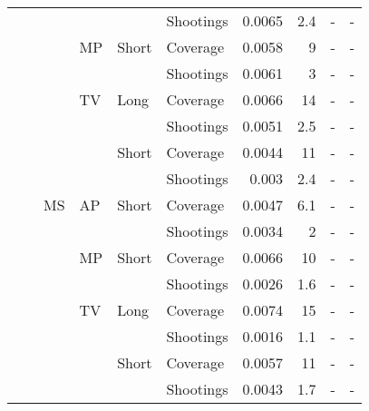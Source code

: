 \documentclass[article]{standalone}
\begin{document}
\begin{tabular}{llllllrrrr}
             &                   &    &    &       & Shootings &               0.0065 &       2.4 &                    - &                     - \\
             &                   &    & MP & Short & Coverage &               0.0058 &         9 &                    - &                     - \\
             &                   &    &    &       & Shootings &               0.0061 &         3 &                    - &                     - \\
             &                   &    & TV & Long & Coverage &               0.0066 &        14 &                    - &                     - \\
             &                   &    &    &       & Shootings &               0.0051 &       2.5 &                    - &                     - \\
             &                   &    &    & Short & Coverage &               0.0044 &        11 &                    - &                     - \\
             &                   &    &    &       & Shootings &                0.003 &       2.4 &                    - &                     - \\
             &                   & MS & AP & Short & Coverage &               0.0047 &       6.1 &                    - &                     - \\
             &                   &    &    &       & Shootings &               0.0034 &         2 &                    - &                     - \\
             &                   &    & MP & Short & Coverage &               0.0066 &        10 &                    - &                     - \\
             &                   &    &    &       & Shootings &               0.0026 &       1.6 &                    - &                     - \\
             &                   &    & TV & Long & Coverage &               0.0074 &        15 &                    - &                     - \\
             &                   &    &    &       & Shootings &               0.0016 &       1.1 &                    - &                     - \\
             &                   &    &    & Short & Coverage &               0.0057 &        11 &                    - &                     - \\
             &                   &    &    &       & Shootings &               0.0043 &       1.7 &                    - &                     - \\
\bottomrule
\end{tabular}
\end{document}
